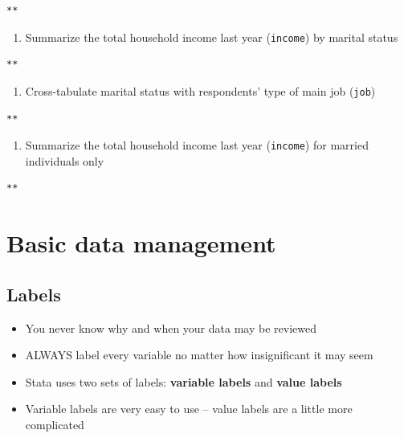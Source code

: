 \documentclass[]{book}
\providecommand{\tightlist}{%
  \setlength{\itemsep}{0pt}\setlength{\parskip}{0pt}}
\begin{document}
\begin{verbatim}
**
\end{verbatim}

\begin{enumerate}
\def\labelenumi{\arabic{enumi}.}
\setcounter{enumi}{3}
\tightlist
\item
  Summarize the total household income last year (\texttt{income}) by marital status
\end{enumerate}

\begin{verbatim}
**
\end{verbatim}

\begin{enumerate}
\def\labelenumi{\arabic{enumi}.}
\setcounter{enumi}{4}
\tightlist
\item
  Cross-tabulate marital status with respondents' type of main job (\texttt{job})
\end{enumerate}

\begin{verbatim}
**
\end{verbatim}

\begin{enumerate}
\def\labelenumi{\arabic{enumi}.}
\setcounter{enumi}{5}
\tightlist
\item
  Summarize the total household income last year (\texttt{income}) for married individuals only
\end{enumerate}

\begin{verbatim}
**
\end{verbatim}

\hypertarget{basic-data-management}{%
\section{Basic data management}\label{basic-data-management}}

\hypertarget{labels}{%
\subsection{Labels}\label{labels}}

\begin{itemize}
\tightlist
\item
  You never know why and when your data may be reviewed
\item
  ALWAYS label every variable no matter how insignificant it may seem
\item
  Stata uses two sets of labels: \textbf{variable labels} and \textbf{value labels}
\item
  Variable labels are very easy to use -- value labels are a little more complicated
\end{itemize}
\end{document}
